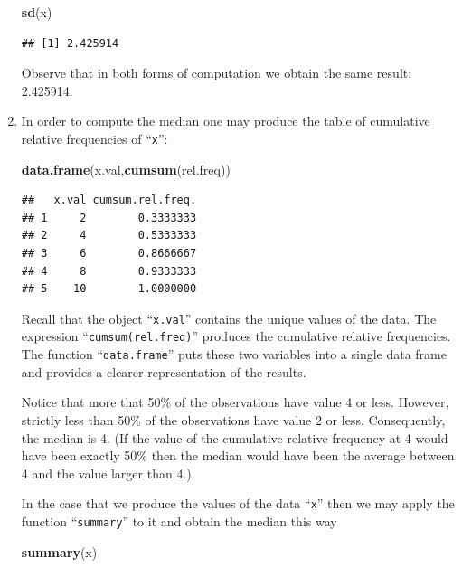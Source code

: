 \documentclass[
]{krantz}
\makeatletter
\newenvironment{Shaded}{\begin{snugshade}}{\end{snugshade}}
\newcommand{\KeywordTok}[1]{\textcolor[rgb]{0.13,0.29,0.53}{\textbf{#1}}}
\newcommand{\NormalTok}[1]{#1}
\newenvironment{kframe}{%
\medskip{}
\setlength{\fboxsep}{.8em}
 \def\at@end@of@kframe{}%
 \ifinner\ifhmode%
  \def\at@end@of@kframe{\end{minipage}}%
  \begin{minipage}{\columnwidth}%
 \fi\fi%
 \def\FrameCommand##1{\hskip\@totalleftmargin \hskip-\fboxsep
 \colorbox{shadecolor}{##1}\hskip-\fboxsep
     \hskip-\linewidth \hskip-\@totalleftmargin \hskip\columnwidth}%
 \MakeFramed {\advance\hsize-\width
   \@totalleftmargin\z@ \linewidth\hsize
   \@setminipage}}%
 {\par\unskip\endMakeFramed%
 \at@end@of@kframe}
\renewenvironment{Shaded}{\begin{kframe}}{\end{kframe}}
\theoremstyle{definition}
\theoremstyle{definition}
\theoremstyle{definition}
\theoremstyle{remark}
\makeatother
\begin{document}
\begin{enumerate}
\begin{Shaded}
\begin{Highlighting}[]
\KeywordTok{sd}\NormalTok{(x)}
\end{Highlighting}
\end{Shaded}

\begin{verbatim}
## [1] 2.425914
\end{verbatim}

  Observe that in both forms of computation we obtain the same result:
  2.425914.
\item
  In order to compute the
  median one may produce the table of cumulative relative frequencies of
  ``\texttt{x}'':

\begin{Shaded}
\begin{Highlighting}[]
\KeywordTok{data.frame}\NormalTok{(x.val,}\KeywordTok{cumsum}\NormalTok{(rel.freq))}
\end{Highlighting}
\end{Shaded}

\begin{verbatim}
##   x.val cumsum.rel.freq.
## 1     2        0.3333333
## 2     4        0.5333333
## 3     6        0.8666667
## 4     8        0.9333333
## 5    10        1.0000000
\end{verbatim}

  Recall that the object ``\texttt{x.val}'' contains the unique values of the data.
  The expression ``\texttt{cumsum(rel.freq)}'' produces the cumulative relative
  frequencies. The function ``\texttt{data.frame}'' puts these two variables into a
  single data frame and provides a clearer representation of the results.

  Notice that more that 50\% of the observations have value 4 or less.
  However, strictly less than 50\% of the observations have value 2 or
  less. Consequently, the median is 4. (If the value of the cumulative
  relative frequency at 4 would have been exactly 50\% then the median
  would have been the average between 4 and the value larger than 4.)

  In the case that we produce the values of the data ``\texttt{x}'' then we may
  apply the function ``\texttt{summary}'' to it and obtain the median this way

\begin{Shaded}
\begin{Highlighting}[]
\KeywordTok{summary}\NormalTok{(x)}
\end{Highlighting}
\end{Shaded}


\end{enumerate}
\end{document}
